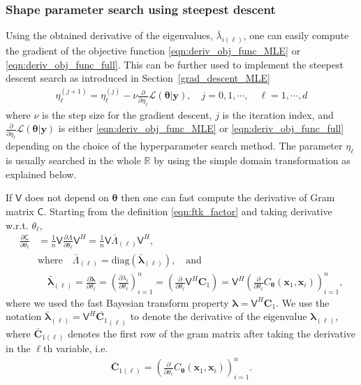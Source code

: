 \documentclass{svjour3}                     %
\newcommand{\bm}[1]{\boldsymbol{#1}}
\newcommand{\reals}{\mathbb{R}}
\newcommand{\vlambda}{{\bm{\lambda}}}
\newcommand{\vtheta}{{\bm{\theta}}}
\newcommand{\vC}{\bm{C}}
\newcommand{\vx}{\bm{x}}
\newcommand{\vy}{\bm{y}}
\newcommand{\mC}{\mathsf{C}}
\newcommand{\mLambda}{\mathsf{\Lambda}}
\newcommand{\mV}{\mathsf{V}}
\newcommand{\diag}{\text{diag}}
\newcommand\secref{Section~\ref}
\begin{document}
\subsubsection{Shape parameter search using steepest descent}
\label{sec:prod-kernel-steep-descent}
Using the obtained derivative of the eigenvalues, $\bar{\lambda}_{i(\ell)}$, one can easily compute the gradient of the objective function \eqref{eqn:deriv_obj_func_MLE} or \eqref{eqn:deriv_obj_func_full}. This can be further used to implement the steepest descent search as introduced in \secref{grad_descent_MLE} 
\begin{align*}
\eta^{(j+1)}_\ell = \eta^{(j)}_\ell - \nu \frac{\partial}{\partial \eta_\ell} \mathcal{L}(\vtheta | \vy), \quad j=0,1,\cdots,  \quad \ell = 1, \cdots, d
\end{align*}
where $\nu$ is the step size for the gradient descent, $j$ is the iteration index, and $\frac{\partial}{\partial \eta_\ell} \mathcal{L}(\vtheta | \vy)$ is either \eqref{eqn:deriv_obj_func_MLE} or \eqref{eqn:deriv_obj_func_full} depending on the choice of the hyperparameter search method. The parameter $\eta_\ell$ is usually searched in the whole $\reals$ by using the simple domain transformation as explained below. %


If $\mV$ does not depend on $\vtheta$ then one can fast compute the derivative of Gram matrix $\mC$. Starting from the definition \eqref{eqn:ftk_factor} and taking derivative w.r.t. $\theta_\ell$, 
\begin{align}
\nonumber
\displaystyle \frac{\partial \mC}{\partial \theta_\ell} 
& = \frac 1n \mV \frac{\partial {\mLambda}}{\partial \theta_\ell} \mV^H
= \frac 1n \mV \bar{\mLambda}_{(\ell)} \mV^H,
\\
\nonumber
& \text{where} \quad \bar{\mLambda}_{(\ell)} = \diag(\bar{\vlambda}_{(\ell)}), \quad \text{and}
\\
\label{eqn:deriv_eigenval_gram_matrix}
&  \quad \bar{\vlambda}_{(\ell)} = \frac{\partial \vlambda}{\partial \theta_\ell} = \left( \frac{\partial \lambda_i}{\partial \theta_\ell} \right)_{i=1}^n 
= \left( \frac{\partial }{\partial \theta_\ell} \mV^H {\vC_1} \right)
= \mV^H \left( \frac{\partial }{\partial \theta_\ell} {C_\vtheta(\vx_1,\vx_i)} \right)_{i=1}^n,
\end{align}
where we used the fast Bayesian transform property $\vlambda 
= \mV^H \vC_1$. %
We use the notation $\bar{\vlambda}_{(\ell)} = \mV^H \bar{\vC_1}_{(\ell)}$ to denote the derivative of the eigenvalue ${\vlambda}_{(\ell)}$,  where $\bar{\vC}_{1(\ell)}$ denotes the first row of the gram matrix after taking the derivative in the $\ell$th variable, i.e.
\begin{align*}
\bar{\vC}_{1{(\ell)}} = \left(\frac{\partial }{\partial{\theta}_\ell} C_\vtheta(\vx_1,\vx_i) \right)_{i=1}^n.
\end{align*}
\end{document}
